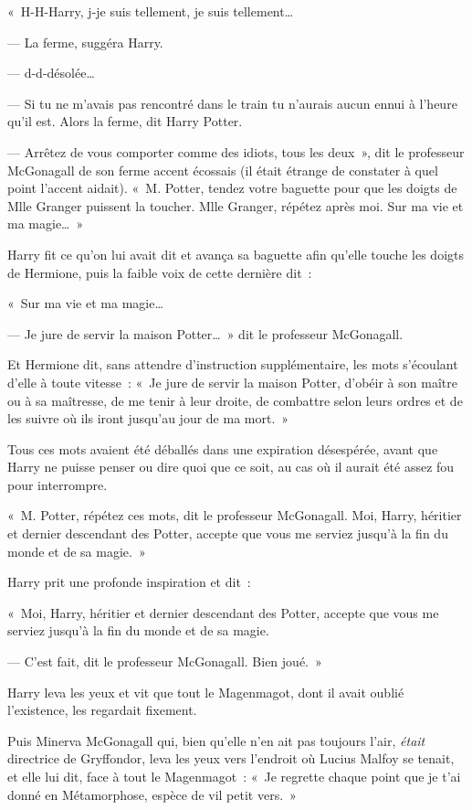 «~H-H-Harry, j-je suis tellement, je suis tellement…

--- La ferme, suggéra Harry.

--- d-d-désolée…

--- Si tu ne m'avais pas rencontré dans le train tu n'aurais aucun ennui à l'heure qu'il est.
Alors la ferme, dit Harry Potter.

--- Arrêtez de vous comporter comme des idiots, tous les deux~», dit le professeur McGonagall de son ferme accent écossais (il était étrange de constater à quel point l'accent aidait).
«~M. Potter, tendez votre baguette pour que les doigts de Mlle Granger puissent la toucher.
Mlle Granger, répétez après moi.
Sur ma vie et ma magie…~»

Harry fit ce qu'on lui avait dit et avança sa baguette afin qu'elle touche les doigts de Hermione, puis la faible voix de cette dernière dit~:

«~Sur ma vie et ma magie…

--- Je jure de servir la maison Potter…~»
dit le professeur McGonagall.

Et Hermione dit, sans attendre d'instruction supplémentaire, les mots s'écoulant d'elle à toute vitesse~: «~Je jure de servir la maison Potter, d'obéir à son maître ou à sa maîtresse, de me tenir à leur droite, de combattre selon leurs ordres et de les suivre où ils iront jusqu'au jour de ma mort.~»

Tous ces mots avaient été déballés dans une expiration désespérée, avant que Harry ne puisse penser ou dire quoi que ce soit, au cas où il aurait été assez fou pour interrompre.

«~M. Potter, répétez ces mots, dit le professeur McGonagall.
Moi, Harry, héritier et dernier descendant des Potter, accepte que vous me serviez jusqu'à la fin du monde et de sa magie.~»

Harry prit une profonde inspiration et dit~:

«~Moi, Harry, héritier et dernier descendant des Potter, accepte que vous me serviez jusqu'à la fin du monde et de sa magie.

--- C'est fait, dit le professeur McGonagall.
Bien joué.~»

Harry leva les yeux et vit que tout le Magenmagot, dont il avait oublié l'existence, les regardait fixement.

Puis Minerva McGonagall qui, bien qu'elle n'en ait pas toujours l'air, \emph{était} directrice de Gryffondor, leva les yeux vers l'endroit où Lucius Malfoy se tenait, et elle lui dit, face à tout le Magenmagot~: «~Je regrette chaque point que je t'ai donné en Métamorphose, espèce de vil petit vers.~»

